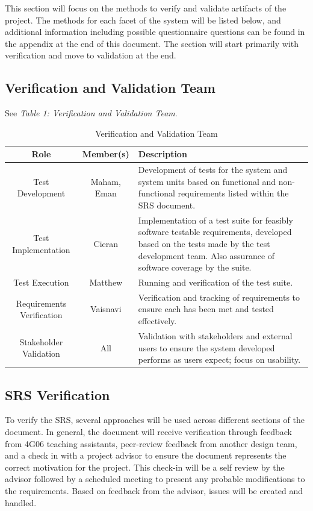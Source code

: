 \documentclass[12pt, titlepage]{article}
\begin{document}
This section will focus on the methods to verify and validate artifacts of the project. The methods for each facet of the system will be listed below, and additional information including possible questionnaire questions can be found in the appendix at the end of this document. The section will start primarily with verification and move to validation at the end.

\subsection{Verification and Validation Team}
See \textit{Table 1: Verification and Validation Team}.
\begin{table}
  \centering
  \begin{tabular}{|c|c|m{6cm}|}
    \hline \textbf{Role} & \textbf{Member(s)} & \textbf{Description} \\ \hline
    Test Development & Maham, Eman & Development of tests for the system and system units based on functional and non-functional requirements listed within the SRS document. \\ \hline
    Test Implementation & Cieran & Implementation of a test suite for feasibly software testable requirements, developed based on the tests made by the test development team. Also assurance of software coverage by the suite. \\ \hline
    Test Execution & Matthew & Running and verification of the test suite. \\ \hline
    Requirements Verification & Vaisnavi & Verification and tracking of requirements to ensure each has been met and tested effectively. \\ \hline
    Stakeholder Validation & All & Validation with stakeholders and external users to ensure the system developed performs as users expect; focus on usability. \\ \hline
  \end{tabular}
  \caption{Verification and Validation Team}
\end{table}
\subsection{SRS Verification}

To verify the SRS, several approaches will be used across different sections of the document. In general, the document will receive verification through feedback from 4G06 teaching assistants, peer-review feedback from another design team, and a check in with a project advisor to ensure the document represents the correct motivation for the project. This check-in will be a self review by the advisor followed by a scheduled meeting to present any probable modifications to the requirements. Based on feedback from the advisor, issues will be created and handled.
\end{document}
